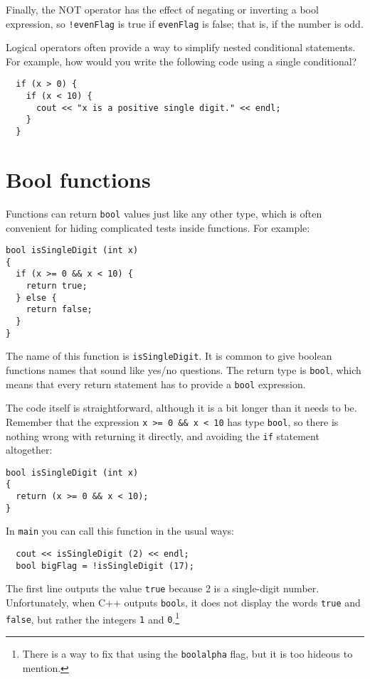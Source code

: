 Finally, the NOT operator has the effect of negating or
inverting a bool expression, so {\tt !evenFlag} is true
if {\tt evenFlag} is false; that is, if the number is odd.


Logical operators often provide a way to simplify nested
conditional statements.  For example, how would you write
the following code using a single conditional?

\begin{verbatim}
  if (x > 0) {
    if (x < 10) {
      cout << "x is a positive single digit." << endl;
    }
  }
\end{verbatim}

\section{Bool functions}
\label{bool}

Functions can return {\tt bool} values just like any other type,
which is often convenient for hiding complicated tests inside
functions.  For example:

\begin{verbatim}
bool isSingleDigit (int x)
{
  if (x >= 0 && x < 10) {
    return true;
  } else {
    return false;
  }
}
\end{verbatim}
%
The name of this function is {\tt isSingleDigit}.  It is common
to give boolean functions names that sound like yes/no questions.
The return type is {\tt bool}, which means that every return
statement has to provide a {\tt bool} expression.

The code itself is straightforward, although it is a bit longer than
it needs to be.  Remember that the expression {\tt x >= 0 \&\& x < 10}
has type {\tt bool}, so there is nothing wrong with returning it
directly, and avoiding the {\tt if} statement altogether:

\begin{verbatim}
bool isSingleDigit (int x)
{
  return (x >= 0 && x < 10);
}
\end{verbatim}
%
In {\tt main} you can call this function in the usual ways:

\begin{verbatim}
  cout << isSingleDigit (2) << endl;
  bool bigFlag = !isSingleDigit (17);
\end{verbatim}
%
The first line outputs the value {\tt true} because 2 is a
single-digit number.  Unfortunately, when C++ outputs {\tt bool}s, it
does not display the words {\tt true} and {\tt false}, but rather the
integers {\tt 1} and {\tt 0}.\footnote{There is a way to fix that
using the {\tt boolalpha} flag, but it is too hideous to mention.}

